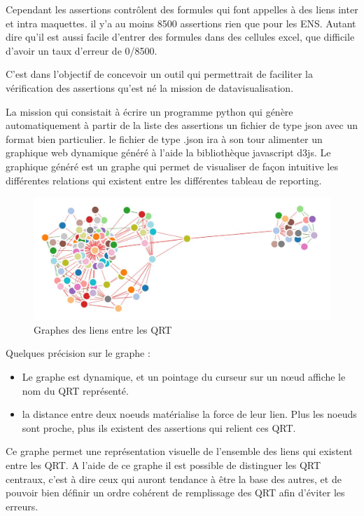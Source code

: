 Cependant les assertions contrôlent des formules qui font appelles à des liens inter et intra maquettes. il y'a au moins 8500 assertions rien que pour les ENS. Autant dire qu'il est aussi facile d'entrer des formules dans des cellules excel, que difficile d'avoir un taux d'erreur de 0/8500.

C'est dans l'objectif de concevoir un outil qui permettrait de faciliter la vérification des assertions qu'est né la mission de datavisualisation.

La mission qui consistait à écrire un programme python qui génère automatiquement à partir de la liste des assertions un fichier de type json avec un format bien particulier. le fichier de type .json ira à son tour alimenter un graphique web dynamique  généré à l'aide la bibliothèque javascript d3js. 
Le graphique généré est un graphe qui permet de visualiser de façon intuitive les différentes relations qui existent entre les différentes tableau de reporting.

\begin{figure}[H]
\centering
\caption{Graphes des liens entre les QRT}
   \includegraphics[scale=0.5]{img/graph.JPG}
\end{figure}

Quelques précision sur le graphe : 
\begin{itemize}
\item Le graphe est dynamique, et un pointage du curseur sur un  nœud affiche le nom du QRT représenté.
\item la distance entre deux noeuds matérialise la force de leur lien. Plus les noeuds sont proche, plus ils existent des assertions qui relient ces QRT.
\end{itemize}

Ce graphe permet une représentation visuelle de l'ensemble des liens qui existent entre les QRT. A l'aide de ce graphe il est possible de distinguer les QRT centraux, c'est à dire ceux qui auront tendance à être la base des autres, et de pouvoir bien définir un ordre cohérent de remplissage des QRT afin d'éviter les erreurs.




